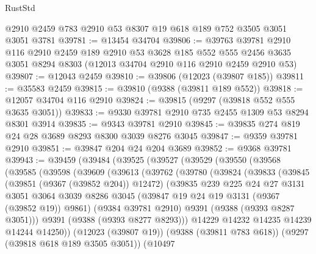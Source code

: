 \begin{lexlean}{RustStd}
\begin{coremodule}
    @2910
    @2459
    @783
    @2910
    @53
    @8307
    @19
    @618
    @189
    @752
    @3505
    @3051
    @3051
    @3781
@39781 := @13454 @34704
@39806 := @39763
    @39781
    @2910
    @116
    @2910
    @2459
    @189
    @2910
    @53
    @3628
    @185
    @552
    @555
    @2456
    @3635
    @3051
    @8294
    @8303
    (@12013 @34704 @2910 @116 @2910 @2459 @2910 @53)
@39807 := @12043 @2459
@39810 := @39806 (@12023 (@39807 @185))
@39811 := @35583 @2459
@39815 := @39810 (@9388 (@39811 @189 @552))
@39818 := @12057 @34704 @116 @2910
@39824 := @39815 (@9297 (@39818 @552 @555 @3635 @3051))
@39833 := @9330 @39781 @2910 @735 @2455 @1309 @53 @8294 @8301 @3914
@39835 := @9343 @39781 @2910
@39845 := @39835 @274 @819 @24 @28 @3689 @8293 @8300 @3039 @8276 @3045
@39847 := @9359 @39781 @2910
@39851 := @39847 @204 @24 @204 @3689
@39852 := @9368 @39781
@39943 := @39459
    (@39484
      (@39525
        (@39527
          (@39529
            (@39550
              (@39568
                (@39585
                  (@39598
                    (@39609
                      (@39613
                        (@39762
                          (@39780
                            (@39824
                              (@39833
                                (@39845
                                  (@39851 (@9367 (@39852 @204)) @12472)
                                  (@39835
                                    @239
                                    @225
                                    @24
                                    @27
                                    @3131
                                    @3051
                                    @3064
                                    @3039
                                    @8286
                                    @3045
                                    (@39847 @19 @24 @19 @3131 (@9367 (@39852 @19)) @9861)
                                    (@9384 @39781 @2910)
                                    @9391
                                    (@9388 (@9393 @8287 @3051)))
                                  @9391
                                  (@9388 (@9393 @8277 @8293)))
                                @14229
                                @14232
                                @14235
                                @14239
                                @14244
                                @14250))
                            (@12023 (@39807 @19))
                            (@9388 (@39811 @783 @618))
                            (@9297 (@39818 @618 @189 @3505 @3051))
                            (@10497

\end{coremodule}
\end{lexlean}
